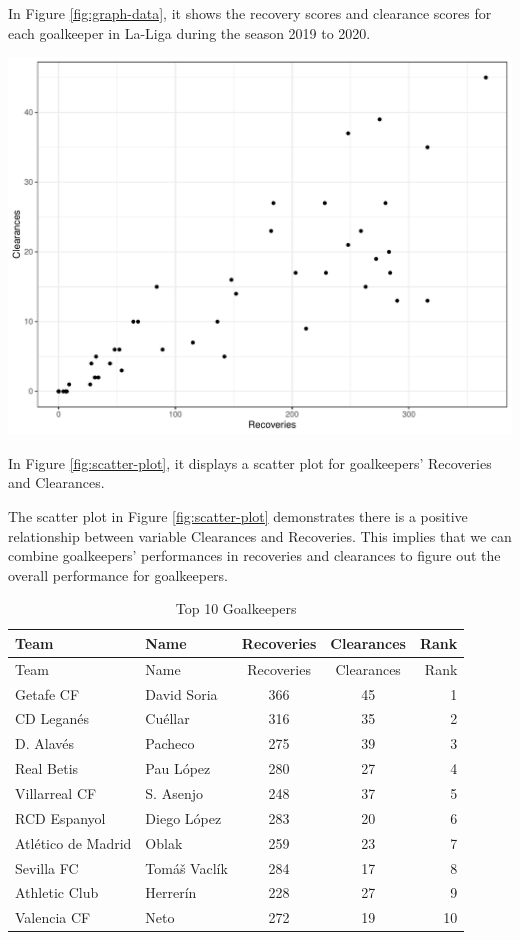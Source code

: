 \documentclass[11pt,a4paper,]{article}
\let\origfigure\figure
\let\endorigfigure\endfigure
\renewenvironment{figure}[1][2] {
    \expandafter\origfigure\expandafter[H]
} {
    \endorigfigure
}
\begin{document}
In Figure \ref{fig:graph-data}, it shows the recovery scores and clearance scores for each goalkeeper in La-Liga during the season 2019 to 2020.

\begin{figure}[H]

{\centering \includegraphics[width=0.8\linewidth]{Assignment-4-ETC5513_files/figure-latex/scatter-plot-1} 

}

\caption{Scatter plot for Recoveries and Clearances}\label{fig:scatter-plot}
\end{figure}

In Figure \ref{fig:scatter-plot}, it displays a scatter plot for goalkeepers' Recoveries and Clearances.

The scatter plot in Figure \ref{fig:scatter-plot} demonstrates there is a positive relationship between variable Clearances and Recoveries. This implies that we can combine goalkeepers' performances in recoveries and clearances to figure out the overall performance for goalkeepers.

\begin{longtable}[]{@{}llccr@{}}
\caption{\label{tab:goal-data1}Top 10 Goalkeepers}\tabularnewline
\toprule
Team & Name & Recoveries & Clearances & Rank \\
\midrule
\endfirsthead
\toprule
Team & Name & Recoveries & Clearances & Rank \\
\midrule
\endhead
Getafe CF & David Soria & 366 & 45 & 1 \\
CD Leganés & Cuéllar & 316 & 35 & 2 \\
D. Alavés & Pacheco & 275 & 39 & 3 \\
Real Betis & Pau López & 280 & 27 & 4 \\
Villarreal CF & S. Asenjo & 248 & 37 & 5 \\
RCD Espanyol & Diego López & 283 & 20 & 6 \\
Atlético de Madrid & Oblak & 259 & 23 & 7 \\
Sevilla FC & Tomáš Vaclík & 284 & 17 & 8 \\
Athletic Club & Herrerín & 228 & 27 & 9 \\
Valencia CF & Neto & 272 & 19 & 10 \\
\bottomrule
\end{longtable}
\end{document}
